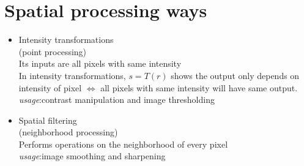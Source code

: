 \section{Spatial processing ways}

\begin{itemize}
\item
  Intensity transformations\\
  (point processing)\\
  Its inputs are all pixels with same intensity\\
  In intensity transformations, $s=T(r)$ shows the output only depends on
  intensity of pixel $\Leftrightarrow$  all pixels with same intensity will have
  same output.\\
  \emph{usage}:contrast manipulation and image thresholding
\item
  Spatial ﬁltering\\
  (neighborhood processing)\\
  Performs operations on the neighborhood of every pixel\\
  \emph{usage}:image smoothing and sharpening
\end{itemize}
